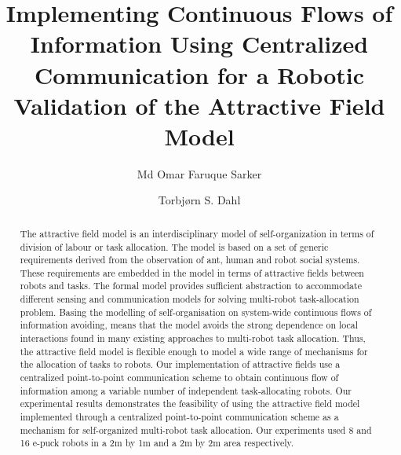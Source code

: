 \documentclass[smallcondensed]{svjour3}
\begin{document}
\title{Implementing Continuous Flows of Information Using Centralized Communication for a Robotic Validation of the Attractive Field Model}
\author{Md Omar Faruque Sarker \and
Torbj{\o}rn S. Dahl %
}
\maketitle
\begin{abstract}
The attractive field model is an interdisciplinary model of self-organization in terms of division of labour or task allocation.  The model is based on a set of generic requirements derived from the observation of ant, human and robot social systems.  These requirements are embedded in the model in terms of attractive fields between robots and tasks.  The formal model provides sufficient abstraction to accommodate different sensing and communication models for solving multi-robot task-allocation problem.  Basing the modelling of self-organisation on system-wide continuous flows of information avoiding, means that the model avoids the strong dependence on local interactions found in many existing approaches to multi-robot task allocation.  Thus, the attractive field model is flexible enough to model a wide range of mechanisms for the allocation of tasks to robots.  Our implementation of attractive fields use a centralized point-to-point communication scheme to obtain continuous flow of information among a variable number of independent task-allocating robots.  Our experimental results demonstrates the feasibility of using the attractive field model implemented through a centralized point-to-point communication scheme as a mechanism for self-organized multi-robot task allocation.  Our experiments used 8 and 16 e-puck robots in a 2m by 1m and a 2m by 2m area respectively.
\end{abstract}
\end{document}
